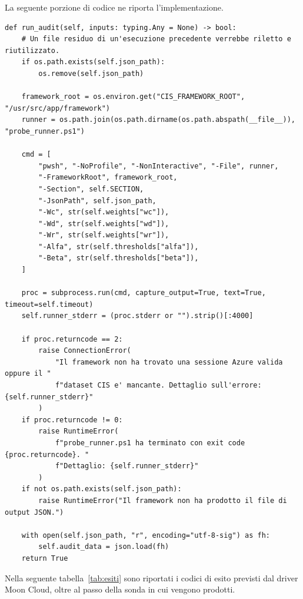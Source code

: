 \documentclass[a4paper,11pt]{report}
\begin{document}
La seguente porzione di codice ne riporta l'implementazione.


\begin{lstlisting}[style=azcli, caption={Atomo \texttt{run\_audit}: invocazione del framework tramite subprocess}, label={lst:run-audit}]
def run_audit(self, inputs: typing.Any = None) -> bool:
    # Un file residuo di un'esecuzione precedente verrebbe riletto e riutilizzato.
    if os.path.exists(self.json_path):
        os.remove(self.json_path)

    framework_root = os.environ.get("CIS_FRAMEWORK_ROOT", "/usr/src/app/framework")
    runner = os.path.join(os.path.dirname(os.path.abspath(__file__)), "probe_runner.ps1")

    cmd = [
        "pwsh", "-NoProfile", "-NonInteractive", "-File", runner,
        "-FrameworkRoot", framework_root,
        "-Section", self.SECTION,
        "-JsonPath", self.json_path,
        "-Wc", str(self.weights["wc"]),
        "-Wd", str(self.weights["wd"]),
        "-Wr", str(self.weights["wr"]),
        "-Alfa", str(self.thresholds["alfa"]),
        "-Beta", str(self.thresholds["beta"]),
    ]

    proc = subprocess.run(cmd, capture_output=True, text=True, timeout=self.timeout)
    self.runner_stderr = (proc.stderr or "").strip()[:4000]

    if proc.returncode == 2:
        raise ConnectionError(
            "Il framework non ha trovato una sessione Azure valida oppure il "
            f"dataset CIS e' mancante. Dettaglio sull'errore: {self.runner_stderr}"
        )
    if proc.returncode != 0:
        raise RuntimeError(
            f"probe_runner.ps1 ha terminato con exit code {proc.returncode}. "
            f"Dettaglio: {self.runner_stderr}"
        )
    if not os.path.exists(self.json_path):
        raise RuntimeError("Il framework non ha prodotto il file di output JSON.")

    with open(self.json_path, "r", encoding="utf-8-sig") as fh:
        self.audit_data = json.load(fh)
    return True
\end{lstlisting}

Nella seguente tabella~\ref{tab:esiti} sono riportati i codici di esito previsti dal driver Moon Cloud, oltre al passo della sonda in cui vengono prodotti.
\end{document}
